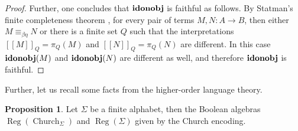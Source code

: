 \documentclass[8pt]{article}
\theoremstyle{definition}
\theoremstyle{definition}
\theoremstyle{definition}
\theoremstyle{definition}
\theoremstyle{definition}
\theoremstyle{definition}
\theoremstyle{definition}
\newtheorem{prop}{Proposition}[section]
\theoremstyle{definition}
\theoremstyle{definition}
\theoremstyle{definition}
\theoremstyle{definition}
\theoremstyle{definition}
\theoremstyle{definition}
\theoremstyle{definition}
\theoremstyle{question}
\begin{document}
\begin{proof}
  Further, one concludes that ${\bf idonobj}$ is faithful as follows. By Statman's finite completeness theorem \cite{statman1982completeness},
  for every pair of terms $M, N : A \to B$, then either $M \equiv_{\beta\eta} N$ or there 
  is a finite set $Q$ such that the interpretations $[\![M]\!]_Q = \pi_Q(M)$ and $[\![N]\!]_Q = \pi_Q(N)$ are different.
  In this case ${\bf idonobj}(M)$ and  ${\bf idonobj}(N)$ are different as well, and therefore ${\bf idonobj}$ is faithful.
\end{proof}

  Further, let us recall some facts from the higher-order language theory.

  \begin{prop}
    Let $\Sigma$ be a finite alphabet, then the Boolean algebras 
    $\operatorname{Reg}(\operatorname{Church}_{\Sigma})$ and $\operatorname{Reg}(\Sigma)$
    given by the Church encoding.
  \end{prop}
\end{document}
